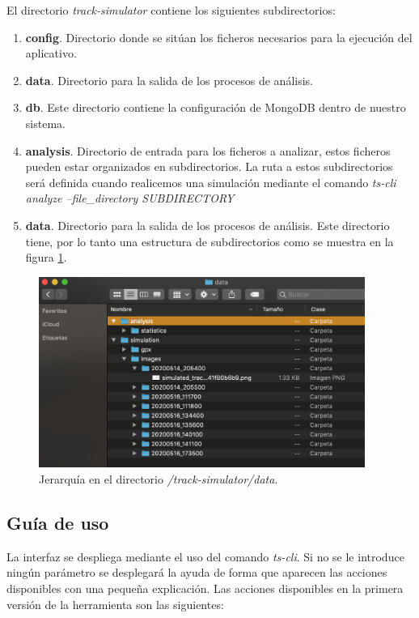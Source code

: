 El directorio  \textit{track-simulator} contiene los siguientes subdirectorios:
\begin{enumerate}[label={D.\arabic*.}]
\item \textbf{config}. Directorio donde se sitúan los ficheros necesarios para la ejecución del aplicativo.\item \textbf{data}. Directorio para la salida de los procesos de análisis.
\item \textbf{db}. Este directorio contiene la configuración de MongoDB dentro de nuestro sistema.
\item \textbf{analysis}. Directorio de entrada para los ficheros a analizar, estos ficheros pueden estar organizados en subdirectorios. La ruta a estos subdirectorios será definida cuando realicemos una simulación mediante el comando \textit{ts-cli analyze 	--file\_directory \lbrack SUBDIRECTORY\rbrack}
\item \textbf{data}. Directorio para la salida de los procesos de análisis. Este directorio tiene, por lo tanto una estructura de subdirectorios como se muestra en la figura \ref{figure:dataFolderHierarchy}.

\end{enumerate}
\begin{figure}[!htb]
\begin{center}
\includegraphics[width=0.95\textwidth]{./Imagenes/dataFolderHierarchy.png}
\caption{Jerarquía en el directorio \textit{\slash track-simulator\slash data}.}
\end{center}
\label{figure:dataFolderHierarchy}
\end{figure}
\newpage

\subsection{Guía de uso}
La interfaz se despliega mediante el uso del comando \textit{ts-cli}. Si no se le introduce ningún parámetro se desplegará la ayuda de forma que aparecen las  acciones disponibles con una pequeña explicación. Las acciones disponibles en la primera versión de la herramienta son las siguientes:


